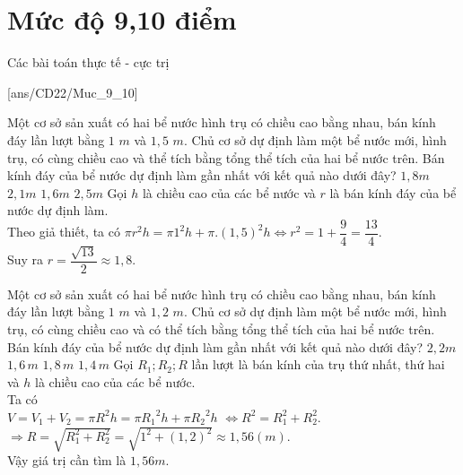 \section{Mức độ 9,10 điểm}
\setcounter{ex}{0}
\setcounter{dang}{0}
\begin{dang}{Các bài toán thực tế - cực trị}
\end{dang}
[ans/CD22/Muc_9_10]
\begin{ex}%
	Một cơ sở sản xuất có hai bể nước hình trụ có chiều cao bằng nhau, bán kính đáy lần lượt bằng $1\,\,m$ và $1,5\,\,m$. Chủ cơ sở dự định làm một bể nước mới, hình trụ, có cùng chiều cao và thể tích bằng tổng thể tích của hai bể nước trên. Bán kính đáy của bể nước dự định làm gần nhất với kết quả nào dưới đây?
	\choice
	{\True$1,8 m$}
	{$2,1 m$}
	{$1,6 m$}
	{$2,5 m$}
	\loigiai
	{Gọi $h$ là chiều cao của các bể nước và $r$ là bán kính đáy của bể nước dự định làm.\\
		Theo giả thiết, ta có $\pi{r^2}h=\pi{1^2}h+\pi .\left(1,5\right)^2h\Leftrightarrow{r^2}=1+\dfrac{9}{4}=\dfrac{13}{4}.$\\
		Suy ra $r=\dfrac{\sqrt{13}}{2}\approx 1,8.$}
\end{ex}
\begin{ex}%
	Một cơ sở sản xuất có hai bể nước hình trụ có chiều cao bằng nhau, bán kính đáy lần lượt bằng $1\,\,m$ và $1,2\,\,m$. Chủ cơ sở dự định làm một bể nước mới, hình trụ, có cùng chiều cao và có thể tích bằng tổng thể tích của hai bể nước trên. Bán kính đáy của bể nước dự định làm gần nhất với kết quả nào dưới đây?
	\choice
	{$2,2m$}
	{\True$1,6\,m$}
	{$1,8\,m$}
	{$1,4\,m$}
	\loigiai
	{Gọi $R_1;R_2;R$ lần lượt là bán kính của trụ thứ nhất, thứ hai và $h$ là chiều cao của các bể nước.\\ 
		Ta có \\
		$V=V_1+V_2=\pi{R^2}h=\pi{R_1}^2h+\pi{R_2}^2h$
		$\Leftrightarrow {R^2}=R_1^2+R_2^2.$\\ 
		$\Rightarrow R=\sqrt{R_1^2+R_2^2}=\sqrt{1^2+\left(1,2\right)^2}\approx 1,56(m).$\\
		Vậy giá trị cần tìm là $1,56m$.}
\end{ex}
